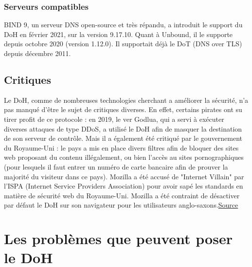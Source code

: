 \documentclass[a4paper,12pt]{article}
\begin{document}
	\subsubsection{Serveurs compatibles}
	BIND 9, un serveur DNS open-source et très répandu, a introduit le support du DoH en février 2021, sur la version 9.17.10.
	Quant à Unbound, il le supporte depuis octobre 2020 (version 1.12.0). Il supportait déjà le DoT (DNS over TLS) depuis décembre 2011.
	\subsection{Critiques}
	Le DoH, comme de nombreuses technologies cherchant a améliorer la sécurité, n'a pas manqué d'être le sujet de critiques diverses. En effet, certains pirates ont su tirer profit de ce protocole : en 2019, le ver Godlua, qui a servi à exécuter diverses attaques de type DDoS, a utilisé le DoH afin de masquer la destination de son serveur de contrôle.
	Mais il a également été critiqué par le gouvernement du Royaume-Uni : le pays a mis en place divers filtres afin de bloquer des sites web proposant du contenu illégalement, ou bien l'accès au sites pornographiques (pour lesquels il faut entrer un numéro de carte bancaire afin de prouver la majorité du visiteur dans ce pays). Mozilla a été accusé de "Internet Villain" par l'ISPA (Internet Service Providers Association) pour avoir sapé les standards en matière de sécurité web du Royaume-Uni. Mozilla a été contraint de désactiver par défaut le DoH sur son navigateur pour les utilisateurs anglo-saxons.\href{https://www.theguardian.com/technology/2019/sep/24/firefox-no-uk-plans-to-make-encrypted-browser-tool-its-default}{Source}
	\section{Les problèmes que peuvent poser le DoH}	
	
\end{document}
